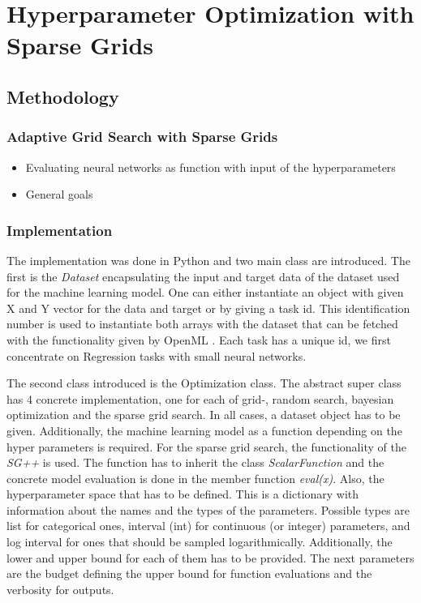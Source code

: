 
\chapter{Hyperparameter Optimization with Sparse Grids}\label{chapter:main_part}

\section{Methodology}

\subsection{Adaptive Grid Search with Sparse Grids}

\begin{itemize}
	\item Evaluating neural networks as function with input of the hyperparameters
	\item General goals
\end{itemize}

\subsection{Implementation}

The implementation was done in Python and two main class are introduced. The first is the \textit{Dataset} encapsulating the input and target data of the dataset used for the machine learning model. One can either instantiate an object with given X and Y vector for the data and target or by giving a task id. This identification number is used to instantiate both arrays with the dataset that can be fetched with the functionality given by OpenML \cite{feurer-arxiv19a}. Each task has a unique id, we first concentrate on Regression tasks with small neural networks. \newline

The second class introduced is the Optimization class. The abstract super class has 4 concrete implementation, one for each of grid-, random search, bayesian optimization and the sparse grid search. In all cases, a dataset object has to be given. Additionally, the machine learning model as a function depending on the hyper parameters is required. For the sparse grid search, the functionality of the \textit{SG++} \cite{valentin2016hierarchical} is used. The function has to inherit the class \textit{ScalarFunction} and the concrete model evaluation is done in the member function \textit{eval(x)}. Also, the hyperparameter space that has to be defined. This is a dictionary with information about the names and the types of the parameters. Possible types are list for categorical ones, interval (int) for continuous (or integer) parameters, and log interval for ones that should be sampled logarithmically. Additionally, the lower and upper bound for each of them has to be provided. The next parameters are the budget defining the upper bound for function evaluations and the verbosity for outputs. \newline

